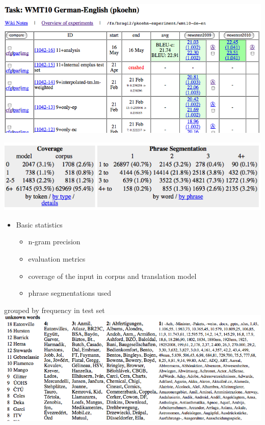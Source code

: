 \documentclass[landscape]{uedslides2C}
\begin{document}

\begin{center}\vspace{-9mm}
\includegraphics[scale=1]{web-interface-runs}
\end{center}


\begin{center}
\includegraphics[scale=1]{analysis-stats.png}
\end{center}
\begin{itemize}
\item Basic statistics
\begin{itemize}
\item n-gram precision
\item evaluation metrics
\item coverage of the input in corpus and translation model
\item phrase segmentations used
\end{itemize}
\end{itemize}


\begin{center}
grouped by frequency in test set\\[5mm]
\includegraphics[scale=1]{analysis-unknown.png}
\end{center}
\end{document}
